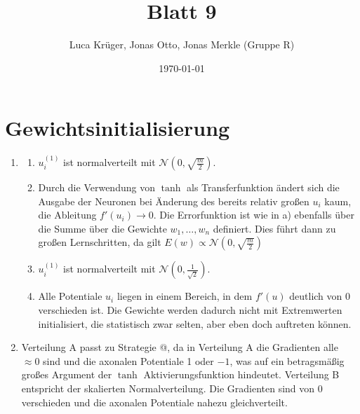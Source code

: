 \documentclass{article}
\title{Blatt 9}
\author{Luca Krüger, Jonas Otto, Jonas Merkle (Gruppe R)}
\date{\today}
\makeatletter
\newcommand*{\rom}[1]{\expandafter\@slowromancap\romannumeral #1@}
\makeatother
\begin{document}
\maketitle
\section{Gewichtsinitialisierung}
\begin{enumerate}
  \item   \begin{enumerate}[label=\alph*)]
          \item $u_i^{(1)}$ ist normalverteilt mit $\mathcal{N}(0, \sqrt{\frac{m}{2}})$.
          \item Durch die Verwendung von $\tanh$ als Transferfunktion ändert sich die Ausgabe der
                Neuronen bei Änderung des bereits relativ großen $u_i$ kaum,
                die Ableitung $f'(u_i) \rightarrow 0$.
                Die Errorfunktion ist wie in a) ebenfalls über die Summe über die Gewichte $w_1,\dots,w_n$ definiert.
                Dies führt dann zu großen Lernschritten, da gilt $E(w)\propto \mathcal{N}(0,\sqrt{\frac{m}{2}})$\\
          \item $u_i^{(1)}$ ist normalverteilt mit $\mathcal{N}(0, \frac{1}{\sqrt{2}})$.
          \item Alle Potentiale $u_i$ liegen in einem Bereich, in dem $f'(u)$ deutlich von 0
                verschieden ist. Die Gewichte werden dadurch nicht mit Extremwerten initialisiert, die statistisch zwar selten, aber eben doch auftreten können.
        \end{enumerate}
  \item Verteilung A passt zu Strategie \rom{1}, da in Verteilung A die Gradienten alle $\approx 0$
        sind und die axonalen Potentiale 1 oder $-1$,  was auf ein betragsmäßig großes Argument
        der $\tanh$ Aktivierungsfunktion hindeutet.
        Verteilung B entspricht der skalierten Normalverteilung. Die Gradienten sind von 0 verschieden
        und die axonalen Potentiale nahezu gleichverteilt.
\end{enumerate}
\end{document}
